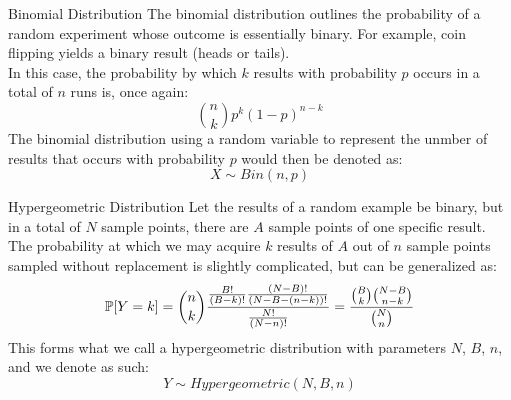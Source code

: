 \begin{ln-define}{Binomial Distribution}{}
    The binomial distribution outlines the probability of a random experiment whose outcome is essentially binary. For example, coin flipping yields a binary result (heads or tails). \\
    In this case, the probability by which $k$ results with probability $p$ occurs in a total of $n$ runs is, once again:
    \[\binom{n}{k} p^k {(1 - p)}^{n - k}\]
    The binomial distribution using a random variable to represent the unmber of results that occurs with probability $p$ would then be denoted as:
    \[X \sim Bin(n, p)\]
\end{ln-define}

\begin{ln-define}{Hypergeometric Distribution}{}
    Let the results of a random example be binary, but in a total of $N$ sample points, there are $A$ sample points of one specific result. \\
    The probability at which we may acquire $k$ results of $A$ out of $n$ sample points sampled without replacement is slightly complicated, but can be generalized as:
    \[\P[Y = k] = \binom{n}{k} \frac{\frac{B!}{(B - k)!} \frac{(N - B)!}{(N - B - (n - k))!}}{\frac{N!}{(N - n)!}} = \frac{\binom{B}{k} \binom{N - B}{n - k}}{\binom{N}{n}}\]
    This forms what we call a hypergeometric distribution with parameters $N$, $B$, $n$, and we denote as such:
    \[Y \sim Hypergeometric(N, B, n)\]
\end{ln-define}

